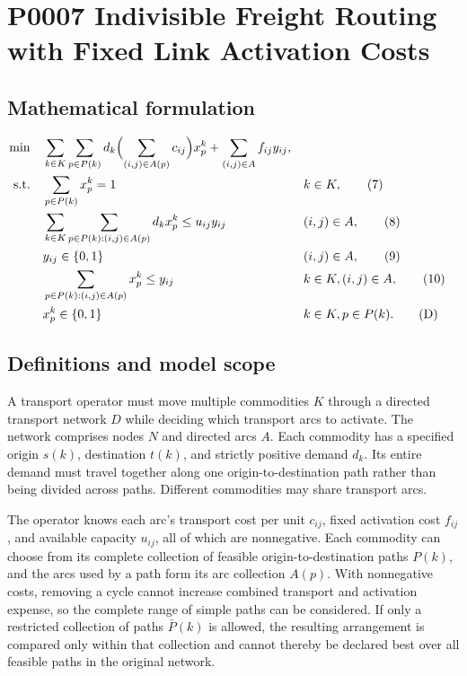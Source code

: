 \documentclass[10pt]{article}
\begin{document}
\section*{P0007 Indivisible Freight Routing with Fixed Link Activation Costs}
\subsection*{Mathematical formulation}
\begin{align}
\min\quad &\sum_{k\in K}\sum_{p\in P(k)}d_k\Bigl(\sum_{(i,j)\in A(p)}c_{ij}\Bigr)x_p^k+\sum_{(i,j)\in A}f_{ij}y_{ij},\label{obj}\\
\text{s.t.}\quad &\sum_{p\in P(k)}x_p^k=1 &&k\in K,\tag{7}\\
&\sum_{k\in K}\sum_{p\in P(k):(i,j)\in A(p)}d_kx_p^k\le u_{ij}y_{ij} &&(i,j)\in A,\tag{8}\\
&y_{ij}\in\{0,1\} &&(i,j)\in A,\tag{9}\\
&\sum_{p\in P(k):(i,j)\in A(p)}x_p^k\le y_{ij} &&k\in K,(i,j)\in A,\tag{10}\\
&x_p^k\in\{0,1\} &&k\in K,p\in P(k).\tag{D}
\end{align}

\subsection*{Definitions and model scope}
A transport operator must move multiple commodities $K$ through a directed transport network $D$ while deciding which transport arcs to activate. The network comprises nodes $N$ and directed arcs $A$. Each commodity has a specified origin $s(k)$, destination $t(k)$, and strictly positive demand $d_k$. Its entire demand must travel together along one origin-to-destination path rather than being divided across paths. Different commodities may share transport arcs.

The operator knows each arc's transport cost per unit $c_{ij}$, fixed activation cost $f_{ij}$, and available capacity $u_{ij}$, all of which are nonnegative. Each commodity can choose from its complete collection of feasible origin-to-destination paths $P(k)$, and the arcs used by a path form its arc collection $A(p)$. With nonnegative costs, removing a cycle cannot increase combined transport and activation expense, so the complete range of simple paths can be considered. If only a restricted collection of paths $\bar P(k)$ is allowed, the resulting arrangement is compared only within that collection and cannot thereby be declared best over all feasible paths in the original network.
\end{document}
